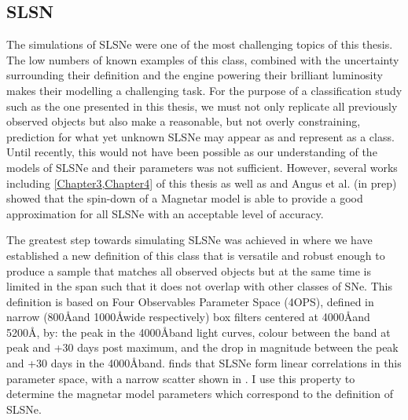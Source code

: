 \subsection{SLSN}
The simulations of SLSNe were one of the most challenging topics of this thesis. The low numbers of known examples of this class, combined with the uncertainty surrounding their definition and the engine powering their brilliant luminosity makes their modelling a challenging task. For the purpose of a classification study such as the one presented in this thesis, we must not only replicate all previously observed objects but also make a reasonable, but not overly constraining, prediction for what yet unknown SLSNe may appear as and represent as a class. Until recently, this would not have been possible as our understanding of the models of SLSNe and their parameters was not sufficient. However, several works including \cref{Chapter3,Chapter4} of this thesis as well as \citet{Inserra2013,Nicoll2013,Nicoll2017} and Angus et al. (in prep) showed that the spin-down of a Magnetar model is able to provide a good approximation for all SLSNe with an acceptable level of accuracy.

The greatest step towards simulating SLSNe was achieved in \citet{Inserra2018a} where we have established a new definition of this class that is versatile and robust enough to produce a sample that matches all observed objects but at the same time is limited in the span such that it does not overlap with other classes of SNe. This definition is based on Four Observables Parameter Space (4OPS), defined in narrow (800\AA and 1000\AA wide respectively) box filters centered at 4000\AA and 5200\AA, by: the peak in the 4000\AA band light curves, colour between the band at peak and +30 days post maximum, and the drop in magnitude between the peak and +30 days in the 4000\AA band. \citet{Inserra2018a} finds that SLSNe form linear correlations in this parameter space, with a narrow scatter shown in . I use this property to determine the magnetar model parameters which correspond to the definition of SLSNe.

